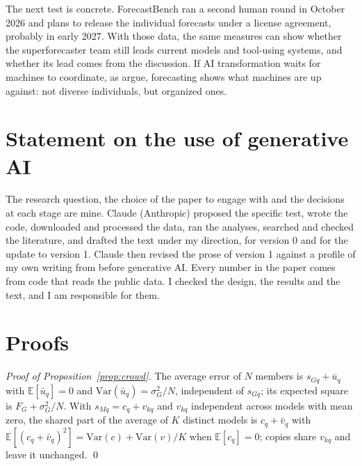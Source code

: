 \documentclass[11pt,a4paper]{article}
\theoremstyle{definition}
\begin{document}
The next test is concrete. ForecastBench ran a second human round in October 2026 and plans to release the individual forecasts under a license agreement, probably in early 2027. With those data, the same measures can show whether the superforecaster team still leads current models and tool-using systems, and whether its lead comes from the discussion. If AI transformation waits for machines to coordinate, as \citet{imas2026organizing} argue, forecasting shows what machines are up against: not diverse individuals, but organized ones.

\section*{Statement on the use of generative AI}

The research question, the choice of the paper to engage with and the decisions at each stage are mine. Claude (Anthropic) proposed the specific test, wrote the code, downloaded and processed the data, ran the analyses, searched and checked the literature, and drafted the text under my direction, for version 0 and for the update to version 1. Claude then revised the prose of version 1 against a profile of my own writing from before generative AI. Every number in the paper comes from code that reads the public data. I checked the design, the results and the text, and I am responsible for them.




\appendix

\section{Proofs}\label{app:proofs}

\emph{Proof of Proposition~\ref{prop:crowd}.} The average error of $N$ members is $s_{Gq}+\bar u_q$ with $\mathbb{E}[\bar u_q]=0$ and $\mathrm{Var}(\bar u_q)=\sigma^2_G/N$, independent of $s_{Gq}$; its expected square is $F_G+\sigma^2_G/N$. With $s_{Mq}=c_q+v_{kq}$ and $v_{kq}$ independent across models with mean zero, the shared part of the average of $K$ distinct models is $c_q+\bar v_q$ with $\mathbb{E}[(c_q+\bar v_q)^2]=\mathrm{Var}(c)+\mathrm{Var}(v)/K$ when $\mathbb{E}[c_q]=0$; copies share $v_{kq}$ and leave it unchanged. \qed
\end{document}
